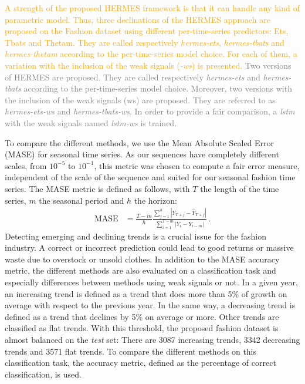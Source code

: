 \documentclass[10pt]{article} %
\begin{document}
\textcolor{orange}{
A strength of the proposed HERMES framework is that it can handle any kind of parametric model. Thus, three declinations of the HERMES approach are proposed on the Fashion dataset using different per-time-series predictors: Ets, Tbats and Thetam. They are called respectively \textit{hermes-ets}, \textit{hermes-tbats} and \textit{hermes-thetam} according to the per-time-series model choice. For each of them, a variation with the inclusion of the weak signals (\textit{-ws}) is presented.}
\textcolor{gray}{Two versions of HERMES are proposed. They are called respectively \textit{hermes-ets} and \textit{hermes-tbats} according to the per-time-series model choice. Moreover, two versions with the inclusion of the weak signals (ws) are proposed. They are referred to as \textit{hermes-ets-ws} and \textit{hermes-tbats-ws}. In order to provide a fair comparison, a \textit{lstm} with the weak signals named \textit{lstm-ws} is trained.}

To compare the different methods, we use the Mean Absolute Scaled Error (MASE) for seasonal time series. As our sequences have completely different scales, from $10^{-5}$ to $10^{-1}$, this metric was chosen to compute a fair error measure, independent of the scale of the sequence and suited for our seasonal fashion time series. The MASE metric is defined as follows, with $T$ the length of the time series, $m$ the seasonal period and $h$ the horizon:
\begin{align*}
\mathrm{MASE} &= \frac{T-m}{h}\frac{\sum_{j=1}^h |Y_{T+j} - \hat{Y}_{T+j}| }{\sum_{i=1}^{T-m} |Y_i - Y_{i-m}|}\,.
\end{align*}
Detecting emerging and declining trends is a crucial issue for the fashion industry. A correct or incorrect prediction could lead to good returns or massive waste due to overstock or unsold clothes. In addition to the MASE accuracy metric, the different methods are also evaluated on a classification task and especially differences between methods using weak signals or not. In a given year, an increasing trend is defined as a trend that does more than 5\% of growth on average with respect to the previous year. In the same way, a decreasing trend is defined as a trend that declines by 5\% on average or more. Other trends are classified as flat trends. With this threshold, the proposed fashion dataset is almost balanced on the {\em test} set: There are 3087 increasing trends, 3342 decreasing trends and 3571 flat trends. To compare the different methods on this classification task, the accuracy metric, defined as the percentage of correct classification, is used.
\end{document}
